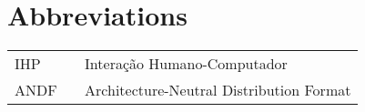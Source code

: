 \chapter*{Abbreviations}

\begin{flushleft}
\begin{tabular}{l p{0.8\linewidth}}
IHP      & Interação Humano-Computador\\
ANDF     & Architecture-Neutral Distribution Format\\
\end{tabular}
\end{flushleft}

